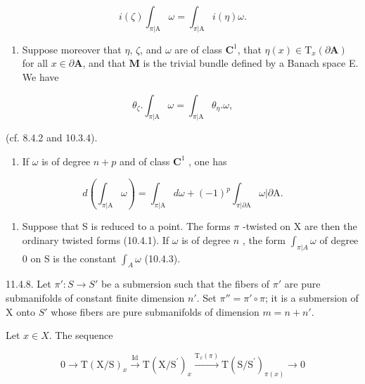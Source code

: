 \[
i (\zeta) \int_ {\pi | \mathrm{A}} \omega = \int_ {\pi | \mathrm{A}} i (\eta) \omega .
\]

\begin{enumerate}
\def\labelenumi{\alph{enumi})}
\setcounter{enumi}{2}
\tightlist
\item
  Suppose moreover that \(\eta\), \(\zeta\), and \(\omega\) are of class \(\mathbf{C}^1\), that \(\eta(x) \in \mathrm{T}_x(\partial \mathbf{A})\) for all \(x \in \partial \mathbf{A}\), and that \(\mathbf{M}\) is the trivial bundle defined by a Banach space E. We have
\end{enumerate}

\[
\theta_ {\zeta}. \int_ {\pi | \mathrm{A}} \omega = \int_ {\pi | \mathrm{A}} \theta_ {\eta}. \omega ,
\]

(cf. 8.4.2 and 10.3.4).

\begin{enumerate}
\def\labelenumi{\alph{enumi})}
\setcounter{enumi}{3}
\tightlist
\item
  If \(\omega\) is of degree \(n + p\) and of class \(\mathbf{C}^1\) , one has
\end{enumerate}

\[
d \left(\int_ {\pi | \mathrm{A}} \omega\right) = \int_ {\pi | \mathrm{A}} d \omega + (- 1) ^ {p} \int_ {\pi | \partial \mathrm{A}} \omega | \partial \mathrm{A}.
\]

\begin{enumerate}
\def\labelenumi{\alph{enumi})}
\setcounter{enumi}{4}
\tightlist
\item
  Suppose that S is reduced to a point. The forms \(\pi\) -twisted on X are then the ordinary twisted forms (10.4.1). If \(\omega\) is of degree \(n\) , the form \(\int_{\pi|A} \omega\) of degree 0 on S is the constant \(\int_{A} \omega\) (10.4.3).
\end{enumerate}

11.4.8. Let \(\pi': S \to S'\) be a submersion such that the fibers of \(\pi'\) are pure submanifolds of constant finite dimension \(n'\). Set \(\pi'' = \pi' \circ \pi\); it is a submersion of X onto \(S'\) whose fibers are pure submanifolds of dimension \(m = n + n'\).

Let \(x\in X\). The sequence

\[
0 \longrightarrow \mathrm{T} (\mathrm{X} / \mathrm{S}) _ {x} \stackrel {\mathrm{Id}} {\longrightarrow} \mathrm{T} (\mathrm{X} / \mathrm{S} ^ {\prime}) _ {x} \stackrel {\mathrm{T} _ {x} (\pi)} {\longrightarrow} \mathrm{T} (\mathrm{S} / \mathrm{S} ^ {\prime}) _ {\pi (x)} \longrightarrow 0
\]

